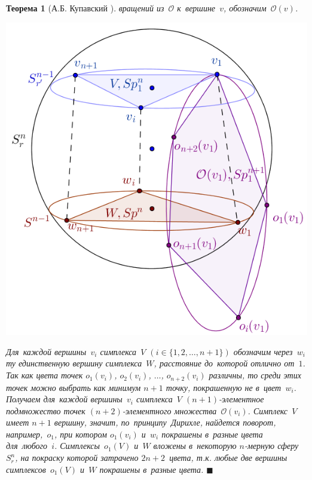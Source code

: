 \documentclass{report}%
\newtheorem{theorem}{Теорема}
\newenvironment{proof}{\par\noindent{\bf Доказательство.}}{\hfill$\scriptstyle\blacksquare$}
\begin{document}
\begin{theorem}[А.Б. Купавский \cite{Kupavsky2011}]
\begin{proof}
				вращений из~$\mathcal{O}$ к~вершине~$v$, обозначим~$\mathcal{O}(v)$. \\
				\begin{center}
						\includegraphics[scale = 1]{sphere}
				\end{center}
				
				\noindent Для~каждой вершины~$v_i$ симплекса~$V$ $( i \in \{1, 2, \ldots, n+1\})$ обозначим через~$w_i$ ту единственную вершину симплекса~$W$,
				расстояние до~которой отлично от~$1$. Так как цвета точек $o_1(v_i)$, $o_2(v_i)$, $\ldots$, $o_{n+2}(v_i)$ различны,
				то среди этих точек можно выбрать как минимум $n+1$ точку, покрашенную не в~цвет~$w_i$.
				Получаем для~каждой вершины~$v_i$ симплекса~$V$ $(n+1)$-элементное подмножество точек $(n+2)$-элементного множества~$\mathcal{O}(v_i)$.
				Симплекс~$V$ имеет $n+1$ вершину, значит, по~принципу~Дирихле, найдется поворот, например,~$o_1$,
				при котором $o_1(v_i)$ и~$w_i$ покрашены в~разные цвета для~любого~$i$.
				Симплексы~$o_1(V)$ и~$W$ вложены в~некоторую $n$-мерную сферу~$S_r^n$, на покраску которой затрачено $2n+2$~цвета,
				т.к. любые две вершины симплексов~$o_1(V)$ и~$W$ покрашены в~разные цвета. 
		\end{proof}
\end{theorem}
\end{document}
